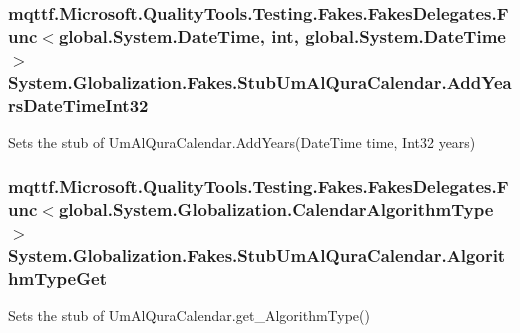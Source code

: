 \hypertarget{class_system_1_1_globalization_1_1_fakes_1_1_stub_um_al_qura_calendar_a87c835fe69981e4082c88a7ac7fee45e}{
\subsubsection[{Add\-Years\-Date\-Time\-Int32}]{\setlength{\rightskip}{0pt plus 5cm}mqttf.\-Microsoft.\-Quality\-Tools.\-Testing.\-Fakes.\-Fakes\-Delegates.\-Func$<$global.\-System.\-Date\-Time, int, global.\-System.\-Date\-Time$>$ System.\-Globalization.\-Fakes.\-Stub\-Um\-Al\-Qura\-Calendar.\-Add\-Years\-Date\-Time\-Int32}}\label{class_system_1_1_globalization_1_1_fakes_1_1_stub_um_al_qura_calendar_a87c835fe69981e4082c88a7ac7fee45e}


Sets the stub of Um\-Al\-Qura\-Calendar.\-Add\-Years(\-Date\-Time time, Int32 years)

\hypertarget{class_system_1_1_globalization_1_1_fakes_1_1_stub_um_al_qura_calendar_ab4d13738a69f628e09f896d8b055abce}{
\subsubsection[{Algorithm\-Type\-Get}]{\setlength{\rightskip}{0pt plus 5cm}mqttf.\-Microsoft.\-Quality\-Tools.\-Testing.\-Fakes.\-Fakes\-Delegates.\-Func$<$global.\-System.\-Globalization.\-Calendar\-Algorithm\-Type$>$ System.\-Globalization.\-Fakes.\-Stub\-Um\-Al\-Qura\-Calendar.\-Algorithm\-Type\-Get}}\label{class_system_1_1_globalization_1_1_fakes_1_1_stub_um_al_qura_calendar_ab4d13738a69f628e09f896d8b055abce}


Sets the stub of Um\-Al\-Qura\-Calendar.\-get\-\_\-\-Algorithm\-Type()

